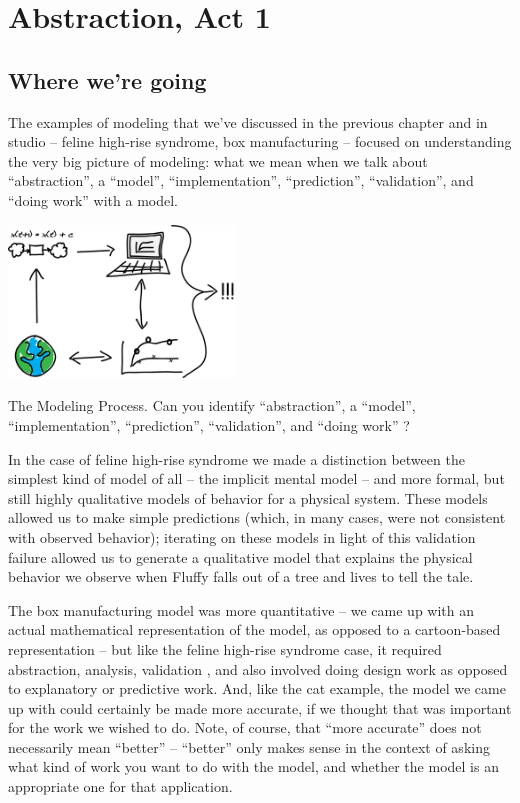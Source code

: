 \chapter{Abstraction, Act 1}


\section*{Where we're going}

The examples of modeling that we've discussed in the previous chapter and in studio -- 
feline high-rise syndrome, box manufacturing -- 
focused on understanding the very big picture of modeling:  what we mean when we talk about ``abstraction'', a ``model'', ``implementation'',  ``prediction'', ``validation'', and ``doing work'' with a model.  

\begin{marginfigure}
\includegraphics[width=6cm]{figs/ModsimDiagram}
\caption{The Modeling Process.  Can you identify ``abstraction'', a ``model'', ``implementation'',  ``prediction'', ``validation'', and ``doing work'' ? 
 }
\end{marginfigure}
In the case of feline high-rise syndrome we made a distinction between the simplest kind of model of all -- the implicit mental model -- and more formal, but still highly qualitative models of behavior for a physical system.  These models allowed us to make simple predictions (which, in many cases, were not consistent with observed behavior); iterating on these models in light of this validation failure allowed us to generate a qualitative model that explains the physical behavior we observe when Fluffy falls out of a tree and lives to tell the tale.  

The box manufacturing model was more quantitative -- we came up with an actual mathematical representation of the model, as opposed to a cartoon-based representation -- but like the feline high-rise syndrome case, it required abstraction, analysis, validation , and also involved doing design work as opposed to explanatory or predictive work.  And, like the cat example, the model we came up with could certainly be made more accurate, if we thought that was important for the work we wished to do.  Note, of course, that ``more accurate'' does not necessarily mean ``better'' -- ``better'' only makes sense in the context of asking what kind of work you want to do with the model, and whether the model is an appropriate one for that application.


